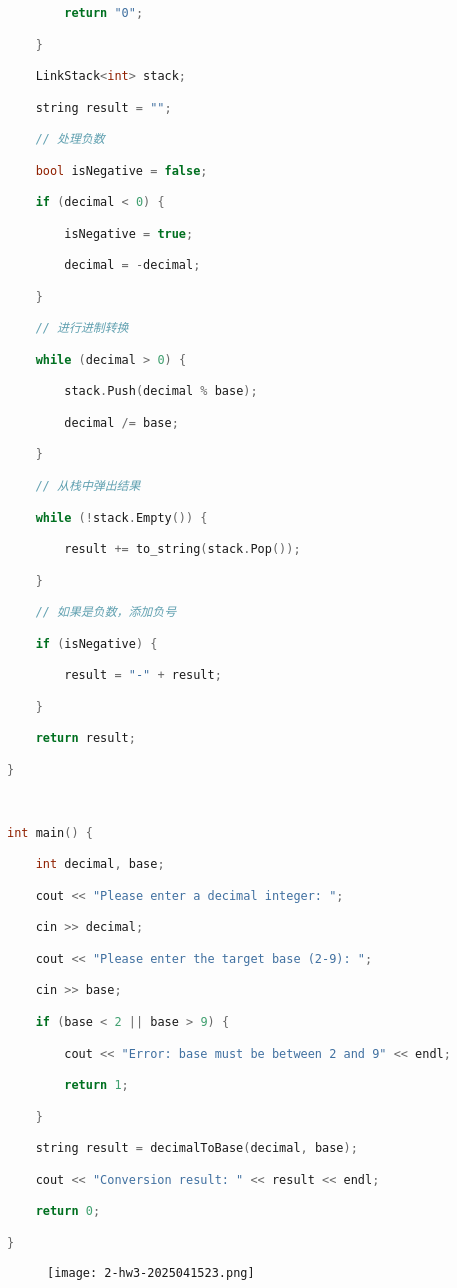 \begin{lstlisting}[language=C++]
        return "0";

    }

    LinkStack<int> stack;

    string result = "";

    // 处理负数

    bool isNegative = false;

    if (decimal < 0) {

        isNegative = true;

        decimal = -decimal;

    }

    // 进行进制转换

    while (decimal > 0) {

        stack.Push(decimal % base);

        decimal /= base;

    }

    // 从栈中弹出结果

    while (!stack.Empty()) {

        result += to_string(stack.Pop());

    }

    // 如果是负数，添加负号

    if (isNegative) {

        result = "-" + result;

    }

    return result;

}

  

int main() {

    int decimal, base;

    cout << "Please enter a decimal integer: ";

    cin >> decimal;

    cout << "Please enter the target base (2-9): ";

    cin >> base;

    if (base < 2 || base > 9) {

        cout << "Error: base must be between 2 and 9" << endl;

        return 1;

    }

    string result = decimalToBase(decimal, base);

    cout << "Conversion result: " << result << endl;

    return 0;

}
\end{lstlisting}
\begin{figure}[H]
\centering
\texttt{[image: 2-hw3-2025041523.png]}
\label{}
\end{figure}

